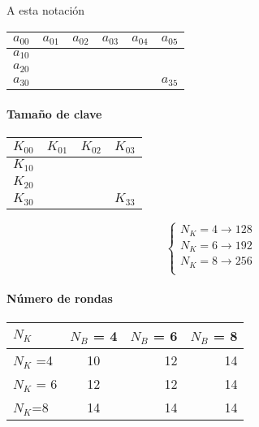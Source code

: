 A esta notación	


	\begin{center}
		
		\begin{tabular}{l | c | r | r | r | r}
			$a_{00}$ & $a_{01}$ & $a_{02}$ & $a_{03}$ & $a_{04}$ & $a_{05}$\\
			\hline
			$a_{10}$ &   &   &   &   &  \\
			\hline
			$a_{20}$ &   &   &   &   &  \\
			\hline
			$a_{30}$ &   &   &   &   & $a_{35}$
			
		\end{tabular}
	\end{center}


\paragraph{Tamaño de clave}

	\begin{center}
		
		\begin{tabular}{l | c | r | r }
		$K_{00}$ & $K_{01}$ & $K_{02}$ & $K_{03}$\\
		\hline
		$K_{10}$ &  &  & \\
		\hline
		$K_{20}$ &  &  & \\
		\hline
		$K_{30}$ &  &  & $K_{33}$
		
		\end{tabular}
	\end{center}
	
		$$\begin{cases}
		N_K = 4 \rightarrow 128\\
		N_K = 6 \rightarrow 192\\
		N_K = 8 \rightarrow 256\\
		\end{cases}$$
		
\paragraph {Número de rondas}
	\begin{center}
		
		\begin{tabular}{l | c | r | r }
		$N_K$ & $N_B$ = 4 & $N_B$ = 6 & $N_B$ = 8\\
		\hline
		$N_K$ =4 &  10 & 12 & 14\\
		\hline
		$N_K$ = 6 & 12 & 12 & 14\\
		\hline
		$N_K$=8 & 14 & 14 & 14
		
		\end{tabular}
	\end{center}

